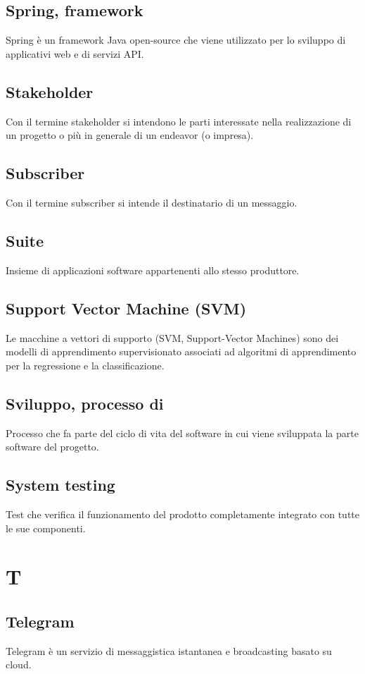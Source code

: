 \subsection{Spring, framework}  Spring è un framework Java open-source che viene utilizzato per lo sviluppo di applicativi web e di servizi API.
\subsection{Stakeholder}  Con il termine stakeholder si intendono le parti interessate nella realizzazione di un progetto o più in generale di un endeavor (o impresa).
\subsection{Subscriber}  Con il termine subscriber si intende il destinatario di un messaggio.
\subsection{Suite}  Insieme di applicazioni software appartenenti allo stesso produttore.
\subsection{Support Vector Machine (SVM)}  Le macchine a vettori di supporto (SVM, Support-Vector Machines) sono dei modelli di apprendimento supervisionato associati ad algoritmi di apprendimento per la regressione e la classificazione.
\subsection{Sviluppo, processo di}  Processo che fa parte del ciclo di vita del software in cui viene sviluppata la parte software del progetto.
\subsection{System testing}  Test che verifica il funzionamento del prodotto completamente integrato con tutte le sue componenti.

\newpage \section{T}
\subsection{Telegram}  Telegram è un servizio di messaggistica istantanea e broadcasting basato su cloud.
